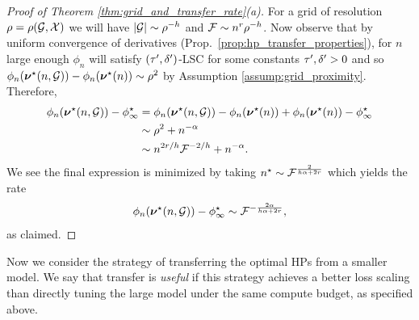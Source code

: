 \begin{proof}[Proof of Theorem \ref{thm:grid_and_transfer_rate}(a)]
    For a grid of resolution $\rho = \rho(\mathcal{G}, \mathcal{X})$ we will have $|\mathcal{G}| \sim \rho^{-h}$ and $\mathcal{F} \sim n^r \rho^{-h}$. Now observe that by uniform convergence of derivatives (Prop.\ \ref{prop:hp_transfer_properties}), for $n$ large enough $\phi_n$ will satisfy $(\tau', \delta')$-LSC for some constants $\tau', \delta' > 0$ and so $\phi_n(\bm{\nu}^\star(n, \mathcal{G})) - \phi_n(\bm{\nu}^\star(n)) \sim \rho^2$ by Assumption \ref{assump:grid_proximity}. Therefore,
    \begin{align*}
        \phi_n(\bm{\nu}^\star(n, \mathcal{G})) - \phi_\infty^\star &= \phi_n(\bm{\nu}^\star(n, \mathcal{G})) - \phi_n(\bm{\nu}^\star(n)) + \phi_n(\bm{\nu}^\star(n)) - \phi_\infty^\star\\ 
        &\sim \rho^{2} + n^{-\alpha}\\
        &\sim n^{2 r/ h} \mathcal{F}^{-2 / h} + n^{-\alpha}.
    \end{align*}
    We see the final expression is minimized by taking $n^\star \sim \mathcal{F}^{\frac{2}{h \alpha + 2 r}}$ which yields the rate
    \[
        \phi_n(\bm{\nu}^\star(n, \mathcal{G})) - \phi_\infty^\star \sim \mathcal{F}^{-\frac{2\alpha }{h \alpha + 2r }},
    \]
    as claimed.
\end{proof}
Now we consider the strategy of transferring the optimal HPs from a smaller model. We say that transfer is \textit{useful} if this strategy achieves a better loss scaling than directly tuning the large model under the same compute budget, as specified above. 

